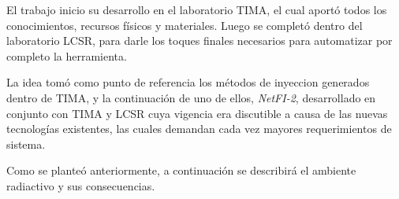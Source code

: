 El trabajo inicio su desarrollo en el laboratorio TIMA, el cual aportó todos los conocimientos, recursos físicos  y materiales. Luego se completó dentro del laboratorio LCSR, para darle los toques finales necesarios para automatizar por completo la herramienta.

La idea  tomó como punto de referencia los métodos de inyeccion generados dentro de TIMA, y la continuación de uno de ellos, \emph{NetFI-2}, desarrollado en conjunto con TIMA y LCSR cuya vigencia era discutible a causa de las nuevas tecnologías existentes, las cuales demandan cada vez mayores requerimientos de sistema.

Como se planteó anteriormente, a continuación se describirá el ambiente radiactivo y sus consecuencias.